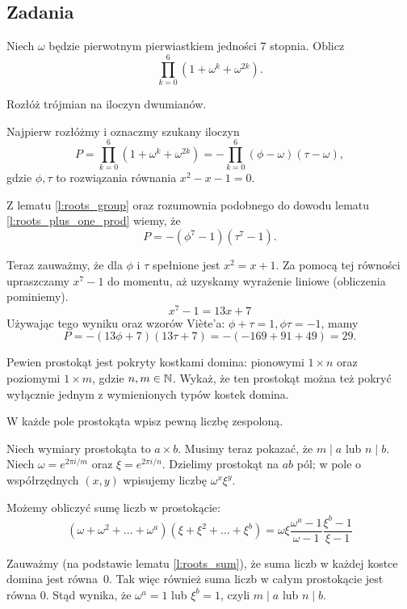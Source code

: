 \documentclass{scrartcl}
\begin{document}
    \subsection{Zadania}
    \begin{problem}
        Niech $\omega$ będzie pierwotnym pierwiastkiem jedności $7$ stopnia. Oblicz
        $$ \prod_{k = 0}^6(1 + \omega^k + \omega^{2k}). $$
        \begin{hint}
            Rozłóż trójmian na iloczyn dwumianów.
        \end{hint}
        \begin{answer}
            Najpierw rozłóżmy i oznaczmy szukany iloczyn
            $$ P = \prod_{k = 0}^6(1 + \omega^k + \omega^{2k}) = -\prod_{k = 0}^6(\phi - \omega)(\tau - \omega), $$
            gdzie $\phi, \tau$ to rozwiązania równania $x^2 - x - 1 = 0$.

            Z lematu \ref{l:roots_group} oraz rozumownia podobnego do dowodu lematu \ref{l:roots_plus_one_prod} wiemy, że
            $$ P = -(\phi^7 - 1)(\tau^7 - 1). $$

            Teraz zauważmy, że dla $\phi$ i $\tau$ spełnione jest $x^2 = x + 1$. Za pomocą tej równości upraszczamy $x^7 - 1$ do momentu, aż uzyskamy wyrażenie liniowe (obliczenia pominiemy).
            $$ x^7 - 1 = 13x + 7 $$
            Używając tego wyniku oraz wzorów Viète'a: $\phi + \tau = 1, \phi\tau = -1$, mamy
            $$ P = -(13\phi + 7)(13\tau + 7) = -(-169 + 91 + 49) = 29. $$
        \end{answer}
    \end{problem}

    \begin{problem}
        Pewien prostokąt jest pokryty kostkami domina: pionowymi $1 \times n$ oraz poziomymi $1 \times m$, gdzie $n, m \in \mathbb N$. Wykaż, że ten prostokąt można też pokryć wyłącznie jednym z wymienionych typów kostek domina.
        \begin{hint}
            W każde pole prostokąta wpisz pewną liczbę zespoloną.
        \end{hint}
        \begin{answer}
            Niech wymiary prostokąta to $a \times b$. Musimy teraz pokazać, że $m \mid a$ lub $n \mid b$. Niech $\omega = e^{2\pi i/m}$ oraz $\xi = e^{2\pi i/n}$. Dzielimy prostokąt na $ab$ pól; w pole o współrzędnych $(x, y)$ wpisujemy liczbę $\omega^x\xi^y$.

            Możemy obliczyć sumę liczb w prostokącie:
            $$ (\omega + \omega^2 + \ldots + \omega^a)(\xi + \xi^2 + \ldots + \xi^b) = \omega\xi\frac{\omega^a - 1}{\omega - 1}\frac{\xi^b - 1}{\xi - 1} $$

            Zauważmy (na podstawie lematu \ref{l:roots_sum}), że suma liczb w każdej kostce domina jest równa~$0$. Tak więc również suma liczb w całym prostokącie jest równa $0$. Stąd wynika, że $\omega^a = 1$ lub $\xi^b = 1$, czyli $m \mid a$ lub $n \mid b$.
        \end{answer}
    \end{problem}
\end{document}

